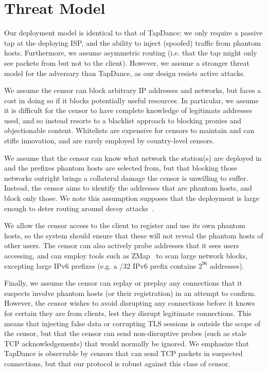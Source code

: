 \documentclass[sigconf]{acmart}
\begin{document}




\section{Threat Model}


Our deployment model is identical to that of TapDance: we only require a passive
tap at the deploying ISP, and the ability to inject (spoofed) traffic from phantom
hosts.
Furthermore, we assume
asymmetric routing (i.e. that the tap might only see packets from but not to the
client).
However, we assume a stronger threat model for the adversary than
TapDance, as our design resists active attacks.


We assume the censor can block arbitrary IP addresses and networks, but faces a
cost in doing so if it blocks potentially useful resources. In particular, we
assume it is difficult for the censor to have complete knowledge of legitimate
addresses used, and so instead resorts to a blacklist approach to blocking
proxies and objectionable content.
Whitelists are expensive for censors to maintain and can stifle
innovation, and are rarely employed by country-level censors.


We assume that the censor can know what network the \scheme station(s) are
deployed in and the prefixes phantom hosts are selected from, but that blocking those
networks outright brings a collateral
damage the censor is unwilling to suffer. Instead, the censor aims to identify
the addresses that are phantom hosts, and block only those. We note this
assumption supposes that the deployment is large enough to deter routing around
decoy attacks~\cite{rad12,true-cost-rad}.

We allow the censor access to the client to register and use its own phantom hosts, 
so the system should ensure that these will not reveal the phantom hosts of other users. The
censor can also actively probe addresses that it sees users accessing, and can
employ tools such as ZMap~\cite{zmap13} to scan large network blocks, excepting
large IPv6 prefixes (e.g. a /32 IPv6 prefix contains $2^{96}$ addresses).

Finally, we assume the censor can replay or preplay any connections that it
suspects involve phantom hosts (or their registration) in an attempt to confirm.
However, the censor wishes to avoid disrupting any connections before it
knows for certain they are from \scheme clients, lest they disrupt legitimate
connections. This means that injecting false data or corrupting TLS sessions is
outside the scope of the censor, but that the censor can send non-disruptive
probes (such as stale TCP acknowledgements) that would normally
be ignored. We emphasize that TapDance is observable by censors that can send
TCP packets in suspected connections, but that our protocol is robust against
this class of censor.
\end{document}
